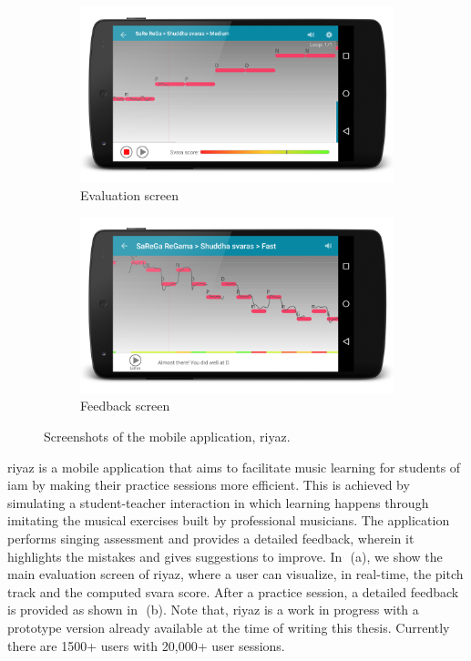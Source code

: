 \begin{figure}
	\begin{subfigure}{\textwidth}
			\centering
		\includegraphics[width=\figSizeSeventy]{ch08_applications/figures/riyaz1.png}
		\caption{Evaluation screen}
		\label{fig:riyaz_evaluation_screen}
	\end{subfigure}
	\begin{subfigure}{\textwidth}
			\centering
		\includegraphics[width=\figSizeSeventy]{ch08_applications/figures/riyaz2.png}
		\caption{Feedback screen}
		\label{fig:riyaz_feedback_screen}
	\end{subfigure}
	\caption{Screenshots of the mobile application, \gls{riyaz}.}
	\label{fig:riyaz_screens}
\end{figure}

\gls{riyaz} is a mobile application that aims to facilitate music learning for students of \gls{iam} by making their practice sessions more efficient. This is achieved by simulating a student-teacher interaction in which learning happens through imitating the musical exercises built by professional musicians. The application performs singing assessment and provides a detailed feedback, wherein it highlights the mistakes and gives suggestions to improve. In~\,(a), we show the main evaluation screen of \gls{riyaz}, where a user can visualize, in real-time, the pitch track and the computed \gls{svara} score. After a practice session, a detailed feedback is provided as shown in~\,(b). Note that, \gls{riyaz} is a work in progress with a prototype version already available at the time of writing this thesis. Currently there are 1500+ users with 20,000+ user sessions. 


